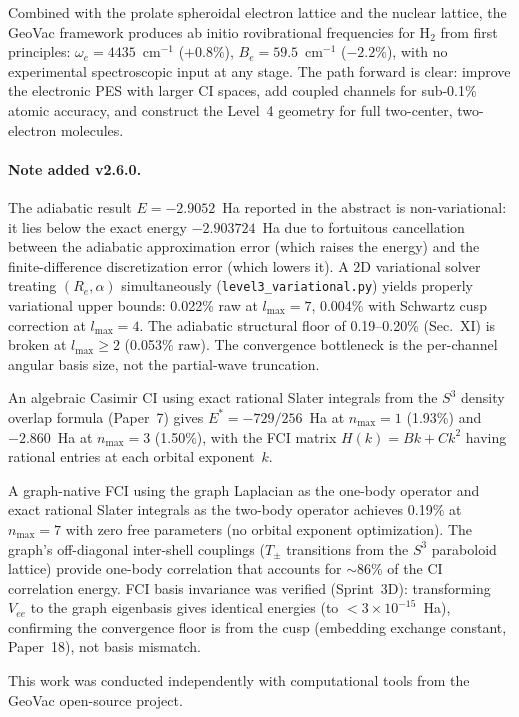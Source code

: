 \documentclass[aps,pra,twocolumn,superscriptaddress,longbibliography]{revtex4-2}
\begin{document}
Combined with the prolate spheroidal electron lattice and the nuclear
lattice, the GeoVac framework produces ab initio rovibrational
frequencies for H$_2$ from first principles: $\omega_e =
4435$~cm$^{-1}$ ($+0.8\%$), $B_e = 59.5$~cm$^{-1}$ ($-2.2\%$),
with no experimental spectroscopic input at any stage.  The path
forward is clear: improve the electronic PES with larger CI spaces,
add coupled channels for sub-0.1\% atomic accuracy, and construct
the Level~4 geometry for full two-center, two-electron molecules.

\paragraph{Note added v2.6.0.}
The adiabatic result $E = -2.9052$~Ha reported in the abstract is
non-variational: it lies below the exact energy $-2.903724$~Ha due to
fortuitous cancellation between the adiabatic approximation error
(which raises the energy) and the finite-difference discretization
error (which lowers it).  A 2D variational solver treating
$(R_e, \alpha)$ simultaneously (\texttt{level3\_variational.py})
yields properly variational upper bounds: 0.022\% raw at
$l_{\max} = 7$, 0.004\% with Schwartz cusp correction at
$l_{\max} = 4$.  The adiabatic structural floor of 0.19--0.20\%
(Sec.~XI) is broken at $l_{\max} \geq 2$ (0.053\% raw).  The
convergence bottleneck is the per-channel angular basis size, not the
partial-wave truncation.

An algebraic Casimir CI using exact rational Slater integrals from the
$S^3$ density overlap formula (Paper~7) gives $E^* = -729/256$~Ha
at $n_{\max} = 1$ (1.93\%) and $-2.860$~Ha at $n_{\max} = 3$
(1.50\%), with the FCI matrix $H(k) = Bk + Ck^2$ having rational
entries at each orbital exponent~$k$.

A graph-native FCI using the graph Laplacian as the one-body operator
and exact rational Slater integrals as the two-body operator achieves
0.19\% at $n_{\max} = 7$ with zero free parameters (no orbital
exponent optimization).  The graph's off-diagonal inter-shell
couplings ($T_\pm$ transitions from the $S^3$ paraboloid lattice)
provide one-body correlation that accounts for $\sim$86\% of the
CI correlation energy.  FCI basis invariance was verified (Sprint~3D):
transforming $V_{ee}$ to the graph eigenbasis gives identical energies
(to $< 3 \times 10^{-15}$~Ha), confirming the convergence floor
is from the cusp (embedding exchange constant, Paper~18), not basis
mismatch.

\begin{acknowledgments}
This work was conducted independently with computational tools from
the GeoVac open-source project.
\end{acknowledgments}
\end{document}
